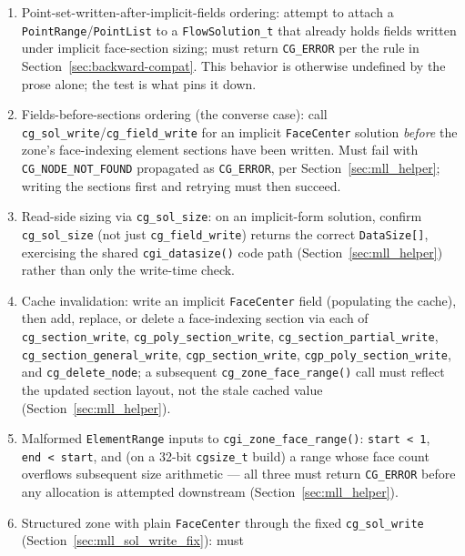 \documentclass[11pt,letterpaper]{article}
\begin{document}
\begin{enumerate}[leftmargin=2em]
  returns \texttt{CG\_NODE\_NOT\_FOUND}; implicit \texttt{FaceCenter}
  write is rejected; the explicit-point-set path remains the only one,
  exactly as today.
\item Point-set-written-after-implicit-fields ordering: attempt to attach
  a \texttt{PointRange}/\texttt{PointList} to a \texttt{FlowSolution\_t}
  that already holds fields written under implicit face-section sizing;
  must return \texttt{CG\_ERROR} per the rule in
  Section~\ref{sec:backward-compat}. This behavior is otherwise
  undefined by the prose alone; the test is what pins it down.
\item Fields-before-sections ordering (the converse case): call
  \texttt{cg\_sol\_write}/\texttt{cg\_field\_write} for an implicit
  \texttt{FaceCenter} solution \emph{before} the zone's face-indexing
  element sections have been written. Must fail with
  \texttt{CG\_NODE\_NOT\_FOUND} propagated as \texttt{CG\_ERROR}, per
  Section~\ref{sec:mll_helper}; writing the sections first and retrying
  must then succeed.
\item Read-side sizing via \texttt{cg\_sol\_size}: on an implicit-form
  solution, confirm \texttt{cg\_sol\_size} (not just
  \texttt{cg\_field\_write}) returns the correct \texttt{DataSize[]},
  exercising the shared \texttt{cgi\_datasize()} code path
  (Section~\ref{sec:mll_helper}) rather than only the write-time check.
\item Cache invalidation: write an implicit \texttt{FaceCenter} field
  (populating the cache), then add, replace, or delete a face-indexing
  section via each of \texttt{cg\_section\_write},
  \texttt{cg\_poly\_section\_write}, \texttt{cg\_section\_partial\_write},
  \texttt{cg\_section\_general\_write}, \texttt{cgp\_section\_write},
  \texttt{cgp\_poly\_section\_write}, and \texttt{cg\_delete\_node}; a
  subsequent \texttt{cg\_zone\_face\_range()} call must reflect the
  updated section layout, not the stale cached value
  (Section~\ref{sec:mll_helper}).
\item Malformed \texttt{ElementRange} inputs to
  \texttt{cgi\_zone\_face\_range()}: \texttt{start~<~1},
  \texttt{end~<~start}, and (on a 32-bit \texttt{cgsize\_t} build) a range
  whose face count overflows subsequent size arithmetic --- all three
  must return \texttt{CG\_ERROR} before any allocation is attempted
  downstream (Section~\ref{sec:mll_helper}).
\item Structured zone with plain \texttt{FaceCenter} through the fixed
  \texttt{cg\_sol\_write} (Section~\ref{sec:mll_sol_write_fix}): must

\end{enumerate}
\end{document}
